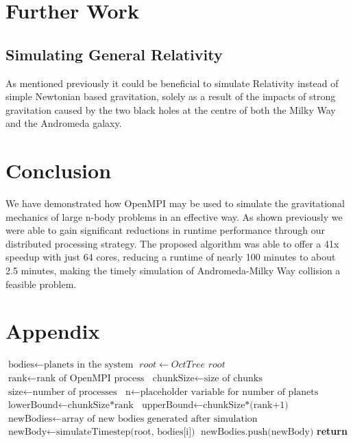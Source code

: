 \documentclass[acmtog,screen, nonacm=true]{acmart}
\begin{document}
\section{Further Work}
\subsection{Simulating General Relativity}
As mentioned previously it could be beneficial to simulate Relativity instead of simple Newtonian based gravitation, solely as a result of the impacts of strong gravitation caused by the two black holes at the centre of both the Milky Way and the Andromeda galaxy. 

\section{Conclusion}
We have demonstrated how OpenMPI may be used to simulate the gravitational mechanics of large n-body problems in an effective way. As shown previously we were able to gain significant reductions in runtime performance through our distributed processing strategy. The proposed algorithm was able to offer a 41x speedup with just 64 cores, reducing a runtime of nearly 100 minutes to about 2.5 minutes, making the timely simulation of Andromeda-Milky Way collision a feasible problem. 





\appendix
\onecolumn
\section{Appendix}
\begin{algorithm}
\caption{Computes the new velocities and positions after one iteration of Barnes-Hut}\label{alg:naive}
\begin{algorithmic}[1]
\State $\text{bodies} \gets \text{planets in the system}$
\State $root \gets \textit{OctTree root}$
\State $\text{rank} \gets \text{rank of OpenMPI process}$
\State $\text{chunkSize} \gets \text{size of chunks}$
\State $\text{size} \gets \text{number of processes}$
\State $\text{n} \gets \text{placeholder variable for number of planets}$
\State $\text{lowerBound} \gets \text{chunkSize*rank}$
\State $\text{upperBound} \gets \text{chunkSize*(rank+1)}$
\State $\text{newBodies} \gets \text{array of new bodies generated after simulation}$
        \State $\text{newBody} \gets \text{simulateTimestep(root, bodies[i])}$
        \State $\text{newBodies.push(newBody)}$
    \EndIf
\EndFor
\textbf{return } 
\EndProcedure
\end{algorithmic}
\end{algorithm}
\end{document}
